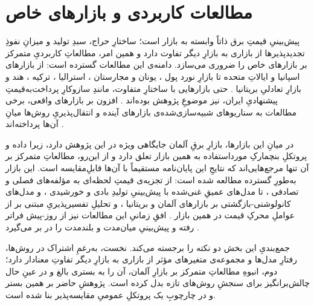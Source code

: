 \section{مطالعات کاربردی و بازارهای خاص}

پیش‌بینیِ قیمتِ برق ذاتاً وابسته به بازار است؛ ساختارِ حراج، سبدِ تولید و میزانِ
نفوذِ تجدیدپذیرها از بازاری به بازارِ دیگر تفاوت دارد و همین امر، مطالعاتِ
کاربردیِ متمرکز بر بازارهای خاص را ضروری می‌سازد. دامنه‌ی این مطالعات گسترده است:
از بازارهای اسپانیا \cite{nogales_forecasting_2002, conejo_day-ahead_2005} و
ایالاتِ متحده \cite{arya_machine_2021, zhang_deep_2020} تا بازارِ نورد پول
\cite{alkawaz_day-ahead_2022}، یونان و مجارستان \cite{haluzan_performance_2020}،
استرالیا \cite{jiang_multivariable_2023, ghimire_two-step_2024}، ترکیه
\cite{ugurlu_electricity_2018}، هند \cite{shah_short-term_2021} و بازارِ تعادلیِ
بریتانیا \cite{lucas_price_2020}. حتی بازارهایی با ساختارِ متفاوت، مانندِ سازوکارِ
پرداخت‌به‌قیمتِ پیشنهادیِ ایران، نیز موضوعِ پژوهش بوده‌اند
\cite{heidarpanah_daily_2023}. افزون بر بازارهای واقعی، برخی مطالعات به سناریوهای
شبیه‌سازی‌شده‌ی بازارهای آینده و انتقال‌پذیریِ روش‌ها میانِ آن‌ها پرداخته‌اند
\cite{nitsch_applying_2024}.

در میانِ این بازارها، بازارِ برقِ آلمان جایگاهی ویژه در این پژوهش دارد، زیرا داده
و پروتکلِ بنچمارکِ مورداستفاده به همین بازار تعلق دارد و از این‌رو، مطالعاتِ
متمرکز بر آن تنها مرجع‌هایی‌اند که نتایجِ این پایان‌نامه مستقیماً با آن‌ها
قابلِ‌مقایسه است. این بازار به‌طورِ گسترده مطالعه شده است: از تجزیه‌ی قیمتِ
لحظه‌ای به مؤلفه‌های فصلی و تصادفی \cite{poggi_electricity_2023}، تا مدل‌های
عمیقِ غنی‌شده با پیش‌بینیِ تولیدِ بادی و خورشیدی \cite{zhang_forecasting_2018}، و
مدل‌های کانولوشنی-بازگشتی بر بازارهای آلمان و بریتانیا
\cite{mubarak_day-ahead_2024}، و تحلیلِ تفسیرپذیریِ مبتنی بر  از عواملِ محرکِ قیمت در همین بازار \cite{trebbien_explainable_2023}. افقِ زمانیِ این مطالعات نیز از روز-پیش فراتر رفته و
پیش‌بینیِ میان‌مدت و بلندمدت را در بر می‌گیرد
\cite{ghelasi_day-ahead_2025, ziel_probabilistic_2018}.

جمع‌بندیِ این بخش دو نکته را برجسته می‌کند. نخست، به‌رغمِ اشتراک در روش‌ها، رفتارِ
مدل‌ها و مجموعه‌ی متغیرهای مؤثر از بازاری به بازارِ دیگر تفاوتِ معنادار دارد؛ دوم،
انبوهِ مطالعاتِ متمرکز بر بازارِ آلمان، آن را به بستری بالغ و در عینِ حال
چالش‌برانگیز برای سنجشِ روش‌های تازه بدل کرده است. پژوهشِ حاضر بر همین بستر و در
چارچوبِ یک پروتکلِ عمومیِ مقایسه‌پذیر بنا شده است.
